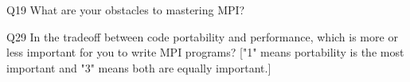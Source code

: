 \begin{description}%
\item{Q19} What are your obstacles to mastering MPI?%
\item{Q29} In the tradeoff between code portability and performance, which is more or less important for you to write MPI programs? ["1" means portability is the most important and "3" means both are equally important.]%
\end{description}%
